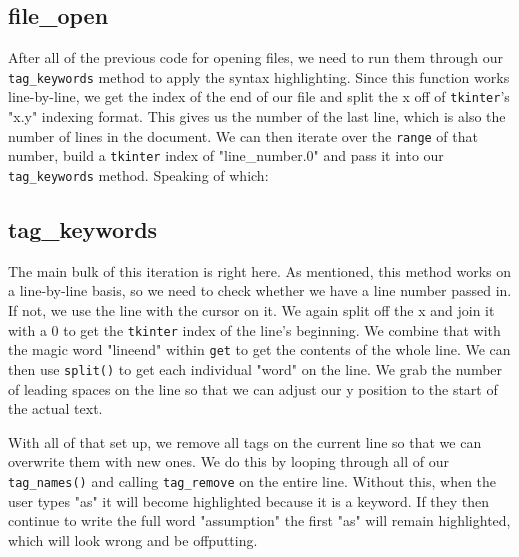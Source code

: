 \documentclass[a4paper,11pt,openany]{book}
\begin{document}


\subsection{file\_open}

After all of the previous code for opening files, we need to run them through our \lstinline[columns=fixed]{tag_keywords} method to apply the syntax highlighting. Since this function works line-by-line, we get the index of the end of our file and split the x off of \lstinline[columns=fixed]{tkinter}'s "x.y" indexing format. This gives us the number of the last line, which is also the number of lines in the document. We can then iterate over the \lstinline[columns=fixed]{range} of that number, build a \lstinline[columns=fixed]{tkinter} index of "line\_number.0" and pass it into our \lstinline[columns=fixed]{tag_keywords} method. Speaking of which:

\subsection{tag\_keywords}

The main bulk of this iteration is right here. As mentioned, this method works on a line-by-line basis, so we need to check whether we have a line number passed in. If not, we use the line with the cursor on it. We again split off the x and join it with a 0 to get the \lstinline[columns=fixed]{tkinter} index of the line's beginning. We combine that with the magic word "lineend" within \lstinline[columns=fixed]{get} to get the contents of the whole line. We can then use \lstinline[columns=fixed]{split()} to get each individual "word" on the line. We grab the number of leading spaces on the line so that we can adjust our y position to the start of the actual text. 

\vspace{5mm}

With all of that set up, we remove all tags on the current line so that we can overwrite them with new ones. We do this by looping through all of our \lstinline[columns=fixed]{tag_names()} and calling \lstinline[columns=fixed]{tag_remove} on the entire line. Without this, when the user types "as" it will become highlighted because it is a keyword. If they then continue to write the full word "assumption" the first "as" will remain highlighted, which will look wrong and be offputting. 
\end{document}
